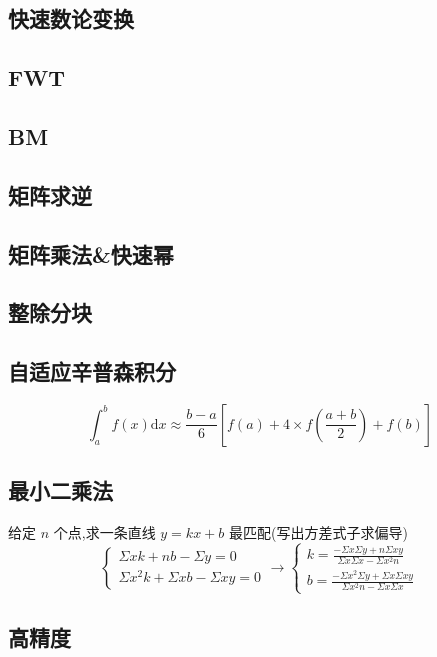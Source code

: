 \documentclass[twocolumn,a4paper]{article}  %
\begin{document}
\subsection{快速数论变换}

\subsection{FWT}

\subsection{BM}

\subsection{矩阵求逆}

\subsection{矩阵乘法\&快速幂}

\subsection{整除分块}

\subsection{自适应辛普森积分}
$$
\int_a^bf(x)\mathrm{d}x\approx{\frac{b-a}{6}}\left[f(a)+4\times f\left({\frac{a+b}{2}}\right)+f(b)\right]
$$

\subsection{最小二乘法}
给定 $n$ 个点,求一条直线 $y=kx+b$ 最匹配(写出方差式子求偏导)
$$
\begin{cases}
	\displaystyle \Sigma xk+nb-\Sigma y=0\\
	\displaystyle \Sigma x^2k+\Sigma xb-\Sigma xy=0
\end{cases}
\rightarrow
\begin{cases}
	\displaystyle k={\frac{-\Sigma x\Sigma y+n\Sigma xy}{\Sigma x\Sigma x-\Sigma x^2n}}\\
	\displaystyle b={\frac{-\Sigma x^2\Sigma y+\Sigma x\Sigma xy}{\Sigma x^2n-\Sigma x\Sigma x}}
\end{cases}
$$

\subsection{高精度}

\newpage
\end{document}

